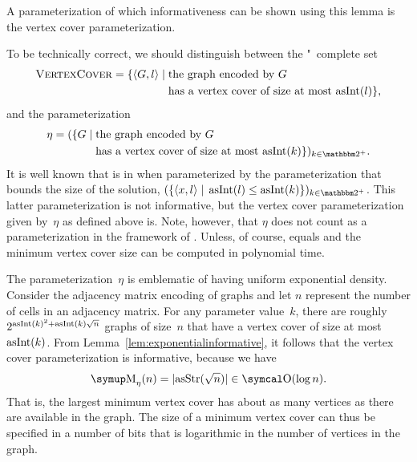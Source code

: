 A parameterization of which informativeness can be shown using this lemma is the vertex cover parameterization.
\begin{example}
\label{ex:vc_informative}%
  To be technically correct, we should distinguish between the "~complete \parencite{garey1979computers} set
  \begin{align*}
    \defkeyat{VertexCover@\pr{VertexCover}}{\pr{VertexCover}} \deq \{\pair{G}{l} \st &\text{the graph encoded by $G$} \\
    	&\text{has a vertex cover of size at most $\asNat(l)$}\},
  \end{align*}
  and the parameterization
  \begin{align*}
    \eta \deq (\{G \st &\text{the graph encoded by $G$} \\
    	&\text{has a vertex cover of size at most $\asNat(k)$}\})_{k \in \binary^+}.
  \end{align*}
  It is well known that  is in  when parameterized by the parameterization that bounds the size of the solution, $(\{\pair{x}{l} \st \asNat(l) \le \asNat(k)\})_{k \in \binary^+}$.
  This latter parameterization is not informative, but the vertex cover parameterization given by~$\eta$ as defined above is.
  Note, however, that $\eta$ does not count as a parameterization in the framework of \citeauthor{flum2006parameterized}.
  Unless, of course,  equals  and the minimum vertex cover size can be computed in polynomial time.

  The parameterization~$\eta$ is emblematic of having uniform exponential density.
  Consider the adjacency matrix encoding of graphs and let $n$ represent the number of cells in an adjacency matrix.
  For any parameter value~$k$, there are roughly $2^{\operatorname{asInt}(k)^2 + \operatorname{asInt}(k)\sqrt{n}}$ graphs of size~$n$ that have a vertex cover of size at most $\operatorname{asInt}(k)$.
  From Lemma~\ref{lem:exponentialinformative}, it follows that the vertex cover parameterization is informative, because we have
  \begin{equation*}
    \upM_\eta(n) = \length{\asStr(\sqrt{n})} \in \bigO(\log n).
  \end{equation*}
  That is, the largest minimum vertex cover has about as many vertices as there are available in the graph.
  The size of a minimum vertex cover can thus be specified in a number of bits that is logarithmic in the number of vertices in the graph.
\end{example}

